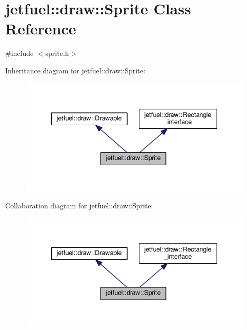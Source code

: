 \hypertarget{classjetfuel_1_1draw_1_1Sprite}{}\section{jetfuel\+:\+:draw\+:\+:Sprite Class Reference}
\label{classjetfuel_1_1draw_1_1Sprite}


{\ttfamily \#include $<$sprite.\+h$>$}



Inheritance diagram for jetfuel\+:\+:draw\+:\+:Sprite\+:\nopagebreak
\begin{figure}[H]
\begin{center}
\leavevmode
\includegraphics[width=336pt]{classjetfuel_1_1draw_1_1Sprite__inherit__graph}
\end{center}
\end{figure}


Collaboration diagram for jetfuel\+:\+:draw\+:\+:Sprite\+:\nopagebreak
\begin{figure}[H]
\begin{center}
\leavevmode
\includegraphics[width=336pt]{classjetfuel_1_1draw_1_1Sprite__coll__graph}
\end{center}
\end{figure}
